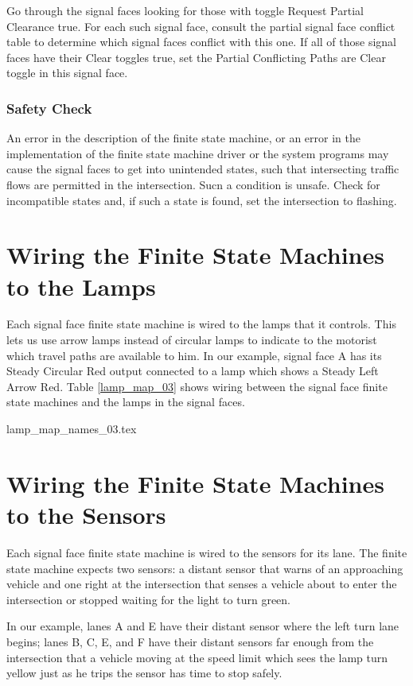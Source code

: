 \documentclass[letterpaper,twoside]{article}
\begin{document}
Go through the signal faces looking for those with toggle Request Partial
Clearance true.  For each such signal face, consult the partial
signal face conflict table to determine which signal faces conflict
with this one.  If all of those signal faces have their Clear toggles
true, set the Partial Conflicting Paths are Clear toggle in this
signal face.

\subsubsection{Safety Check}

An error in the description of the finite state machine, or an error
in the implementation of the finite state machine driver or the
system programs may cause the signal faces to get into unintended
states, such that intersecting traffic flows are permitted in the
intersection.  Sucn a condition is unsafe.  Check for incompatible
states and, if such a state is found, set the intersection to flashing.

\section{Wiring the Finite State Machines to the Lamps}

Each signal face finite state machine is wired to the lamps that
it controls.  This lets us use arrow lamps instead of circular lamps
to indicate to the motorist which travel paths are available to him.
In our example, signal face A has its Steady Circular Red output
connected to a lamp which shows a Steady Left Arrow Red.
Table \ref{lamp_map_03} shows wiring between the signal face finite state
machines and the lamps in the signal faces.

 {lamp_map_names_03.tex}

\section{Wiring the Finite State Machines to the Sensors}

Each signal face finite state machine is wired to the sensors
for its lane.  The finite state machine expects two sensors:
a distant sensor that warns of an approaching vehicle and
one right at the intersection that senses a vehicle about
to enter the intersection or stopped waiting for the light
to turn green.

In our example, lanes A and E have their distant sensor where
the left turn lane begins; lanes B, C, E, and F have their
distant sensors far enough from the intersection that a vehicle
moving at the speed limit which sees the lamp turn yellow
just as he trips the sensor has time to stop safely.
\end{document}
